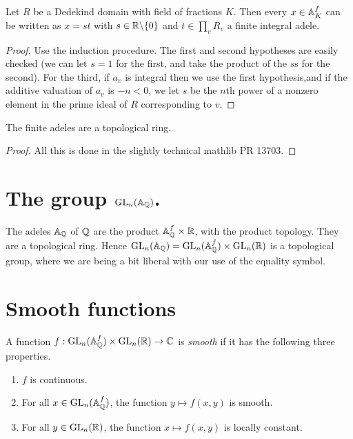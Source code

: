 \begin{theorem}
  \label{DedekindDomain.FiniteAdeleRing.clear_denominator}
  \leanok
Let $R$ be a Dedekind domain with field of fractions $K$. Then every $x\in\mathbb{A}_K^f$ can
be written as $x=st$ with $s\in\mathbb{R}\backslash\{0\}$ and $t\in\prod_v R_v$ a finite integral adele.
\end{theorem}
\begin{proof}
  Use the induction procedure. The first and second hypotheses are easily checked
  (we can let $s=1$ for the first, and take the product of the $s$s for the second).
  For the third, if $a_v$ is integral then we use the first hypothesis,and if the
  additive valuation of $a_v$ is $-n<0$, we let $s$ be the $n$th power of a nonzero
  element in the prime ideal of $R$ corresponding to $v$.
\end{proof}

\begin{corollary}
  \label{DedekindDomain.instTopologicalRingFiniteAdeleRing}
  \leanok
  The finite adeles are a topological ring.
\end{corollary}
\begin{proof} All this is done in the slightly technical mathlib PR 13703.
  \leanok
\end{proof}

\section[The adelic general linear group]{The group $\operatorname{GL}_n(\mathbb{A}_{\mathbb{Q}})$.}

The adeles $\mathbb{A}_{\mathbb{Q}}$ of $\mathbb{Q}$ are the product $\mathbb{A}_{\mathbb{Q}}^f\times\mathbb{R}$, with the product topology.
They are a topological ring. Hence $\operatorname{GL}_n(\mathbb{A}_{\mathbb{Q}})=\operatorname{GL}_n(\mathbb{A}_{\mathbb{Q}}^f)\times\operatorname{GL}_n(\mathbb{R})$ is a
topological group, where we are being a bit liberal with our use of the equality symbol.

\section{Smooth functions}

\begin{definition}
  \label{AutomorphicForm.GLn.IsSmooth}
  A function $f:\operatorname{GL}_n(\mathbb{A}_{\mathbb{Q}}^f)\times\operatorname{GL}_n(\mathbb{R})\to\mathbb{C}$ is \emph{smooth}
  if it has the following three properties.

  \begin{enumerate}
    \item $f$ is continuous.
    \item For all $x\in\operatorname{GL}_n(\mathbb{A}_{\mathbb{Q}}^f)$, the function $y\mapsto f(x,y)$ is smooth.
    \item For all $y\in\operatorname{GL}_n(\mathbb{R})$, the function $x\mapsto f(x,y)$ is locally constant.
  \end{enumerate}
\end{definition}

